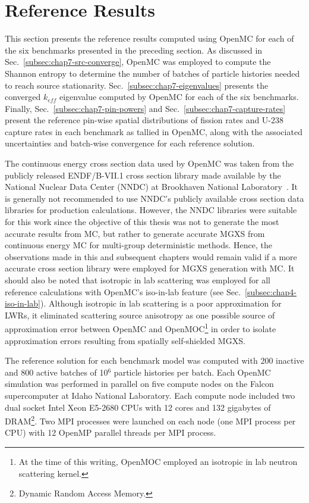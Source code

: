 \section{Reference Results}
\label{sec:chap7-ref-results}

This section presents the reference results computed using OpenMC for each of the six benchmarks presented in the preceding section. As discussed in Sec.~\ref{subsec:chap7-src-converge}, OpenMC was employed to compute the Shannon entropy to determine the number of batches of particle histories needed to reach source stationarity. Sec.~\ref{subsec:chap7-eigenvalues} presents the converged $k_{eff}$ eigenvalue computed by OpenMC for each of the six benchmarks. Finally, Sec.~\ref{subsec:chap7-pin-powers} and Sec.~\ref{subsec:chap7-capture-rates} present the reference pin-wise spatial distributions of fission rates and U-238 capture rates in each benchmark as tallied in OpenMC, along with the associated uncertainties and batch-wise convergence for each reference solution.

The continuous energy cross section data used by OpenMC was taken from the publicly released ENDF/B-VII.1 cross section library made available by the National Nuclear Data Center (NNDC) at Brookhaven National Laboratory~\cite{nndc2016endf}. It is generally not recommended to use NNDC's publicly available cross section data libraries for production calculations. However, the NNDC libraries were suitable for this work since the objective of this thesis was not to generate the most accurate results from \ac{MC}, but rather to generate accurate \ac{MGXS} from continuous energy \ac{MC} for multi-group deterministic methods. Hence, the observations made in this and subsequent chapters would remain valid if a more accurate cross section library were employed for \ac{MGXS} generation with \ac{MC}. It should also be noted that isotropic in lab scattering was employed for all reference calculations with OpenMC's iso-in-lab feature (see Sec.~\ref{subsec:chap4-iso-in-lab}). Although isotropic in lab scattering is a poor approximation for \acp{LWR}, it eliminated scattering source anisotropy as one possible source of approximation error between OpenMC and OpenMOC\footnote{At the time of this writing, OpenMOC employed an isotropic in lab neutron scattering kernel.} in order to isolate approximation errors resulting from spatially self-shielded \ac{MGXS}.

The reference solution for each benchmark model was computed with 200 inactive and 800 active batches of 10$^6$ particle histories per batch. Each OpenMC simulation was performed in parallel on five compute nodes on the Falcon supercomputer at Idaho National Laboratory. Each compute node included two dual socket Intel Xeon E5-2680 CPUs with 12 cores and 132 gigabytes of DRAM\footnote{Dynamic Random Access Memory.}. Two MPI processes were launched on each node (one MPI process per CPU) with 12 OpenMP parallel threads per MPI process.

